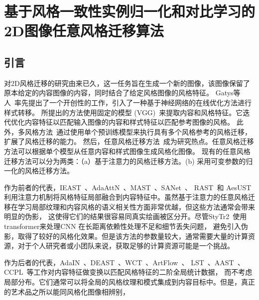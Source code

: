 


\chapter{基于风格一致性实例归一化和对比学习的2D图像任意风格迁移算法}

\section{引言}
对2D风格迁移的研究由来已久，这一任务旨在生成一个新的图像，该图像保留了原本给定的内容图像的内容，同时结合了给定风格图像的风格特征。
Gatys等人~\cite{gatys2016image}率先提出了一个开创性的工作，引入了一种基于神经网络的在线优化方法进行样式转移。
所提出的方法使用固定的模型 (VGG)~\cite{simonyan2014very}来提取内容和风格特征。它迭代优化内容特征以匹配输入图像的内容和样式特征以匹配参考图像的风格。
此外，多风格方法~\cite{dumoulin2016learned}通过使用单个预训练模型来执行具有多个风格参考的风格迁移，扩展了风格迁移的能力。
然后，任意风格迁移方法~\cite{huang2017arbitrary}成为研究热点。任意风格迁移方法可以根据单个模型从任意内容和样式图像生成风格化图像。
现有的任意风格迁移方法可以分为两类：（a）基于注意力的风格迁移方法。(b) 采用可变参数的归一化的风格迁移方法。
\par 作为前者的代表，IEAST~\cite{chen2021artistic}、AdaAttN~\cite{liu2021adaattn}、MAST~\cite{deng2020arbitrary}、SANet~\cite{park2019arbitrary}、
RAST~\cite{ma2023rast}和 AesUST~\cite{wang2022aesust}
利用注意力机制将风格特征局部融合到内容特征中。虽然基于注意力的任意风格迁移在学习局部纹理和内容风格的语义相关性方面非常优越，但这些方法通常会带来明显的伪影，
这使得它们的结果很容易同真实绘画被区分开。尽管StyTr2~\cite{deng2022stytr2}使用transformer来处理CNN 在长距离依赖性处理不足和细节丢失问题，
避免引入伪影，取得了较好的风格化效果。但是该方法的参数量较大，通常需要大量的计算资源，对于个人研究者或小团队来说，获取足够的计算资源可能是一个挑战。
\par 作为后者的代表，AdaIN~\cite{huang2017arbitrary}、DEAST~\cite{zhang2022domain}、WCT~\cite{li2017universal}、ArtFlow~\cite{an2021artflow}、
LST~\cite{li2019learning}、AAST~\cite{hu2020aesthetic}、CCPL~\cite{wu2022ccpl}等工作对内容特征做变换以匹配风格特征的二阶全局统计数据，
而不考虑局部分布。它们通常可以将全局的风格纹理和模式集成到内容目标中。但是，真正的艺术品之所以能同风格化图像相辨别，
